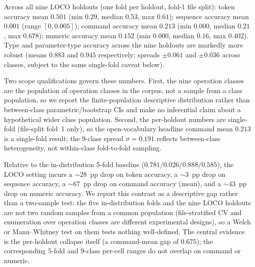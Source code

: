 \documentclass[sensors,article,submit,moreauthors,pdftex]{Definitions/mdpi}
\begin{document}
Across all nine LOCO holdouts (one fold per holdout, fold-1 file split): token accuracy mean $0.501$ (min $0.29$, median $0.53$, max $0.61$); sequence accuracy mean $0.001$ (range $[0, 0.005]$); command accuracy mean $0.213$ (min $0.000$, median $0.21$, max $0.678$); numeric accuracy mean $0.152$ (min $0.000$, median $0.16$, max $0.402$). Type and parameter-type accuracy across the nine holdouts are markedly more robust (means $0.883$ and $0.945$ respectively; spreads $\pm 0.061$ and $\pm 0.036$ across classes, subject to the same single-fold caveat below).

Two scope qualifications govern these numbers. First, the nine operation classes are the population of operation classes in the corpus, not a sample from a class population, so we report the finite-population descriptive distribution rather than between-class parametric/bootstrap CIs and make no inferential claim about a hypothetical wider class population. Second, the per-holdout numbers are single-fold (file-split fold~1 only), so the open-vocabulary headline command mean $0.213$ is a single-fold result; the 9-class spread $\sigma = 0.191$ reflects between-class heterogeneity, not within-class fold-to-fold sampling.

Relative to the in-distribution 5-fold baseline ($0.781 / 0.026 / 0.888 / 0.585$), the LOCO setting incurs a $\sim$$28$~pp drop on token accuracy, a $\sim$$3$~pp drop on sequence accuracy, a $\sim$$67$~pp drop on command accuracy (mean), and a $\sim$$43$~pp drop on numeric accuracy. We report this contrast as a descriptive gap rather than a two-sample test: the five in-distribution folds and the nine LOCO holdouts are not two random samples from a common population (file-stratified CV and enumeration over operation classes are different experimental designs), so a Welch or Mann--Whitney test on them tests nothing well-defined. The central evidence is the per-holdout collapse itself (a command-mean gap of $0.675$); the corresponding 5-fold and 9-class per-cell ranges do not overlap on command or numeric.
\end{document}

